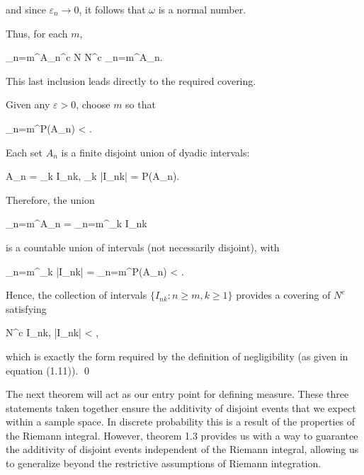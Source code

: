 \begin{proofline}
	and since $\varepsilon_n \to 0$, it follows that $\omega$ is a normal number.
	
	Thus, for each $m$,
	\begin{UNequation}
		\bigcap_{n=m}^\infty A_n^c \subseteq N  \quad
		N^c \subseteq \bigcup_{n=m}^\infty A_n.
	\end{UNequation}
	
	This last inclusion leads directly to the required covering.
	
	Given any $\varepsilon > 0$, choose $m$ so that
	\begin{UNequation}
		\sum_{n=m}^\infty P(A_n) < \varepsilon.
	\end{UNequation}
	
	Each set $A_n$ is a finite disjoint union of dyadic intervals:
	\begin{UNequation}
		A_n = \bigcup_k I_{nk}, \quad \sum_k |I_{nk}| = P(A_n).
	\end{UNequation}
	
	
	Therefore, the union
	\begin{UNequation}
		\bigcup_{n=m}^\infty A_n = \bigcup_{n=m}^\infty \bigcup_k I_{nk}
	\end{UNequation}
	is a countable union of intervals (not necessarily disjoint), with
	\begin{UNequation}
		\sum_{n=m}^\infty \sum_k |I_{nk}| = \sum_{n=m}^\infty P(A_n) < \varepsilon.
	\end{UNequation}
	
	Hence, the collection of intervals $\{ I_{nk} : n \geq m, k \geq 1 \}$ provides a covering of $N^c$ satisfying
	\begin{UNequation}
		N^c \subseteq \bigcup I_{nk}, \quad \sum |I_{nk}| < \varepsilon,
	\end{UNequation}
	which is exactly the form required by the definition of negligibility (as given in equation (1.11)). \hfill \qed 
\end{proofline}

 \quad

The next theorem will act as our entry point for defining measure. These three statements taken together ensure the additivity of disjoint events that we expect within a sample space. In discrete probability this is a result of the properties of the Riemann integral. However, theorem 1.3 provides us with a way to guarantee the additivity of disjoint events independent of the Riemann integral, allowing us to generalize beyond the restrictive assumptions of Riemann integration.\\[10pt]


